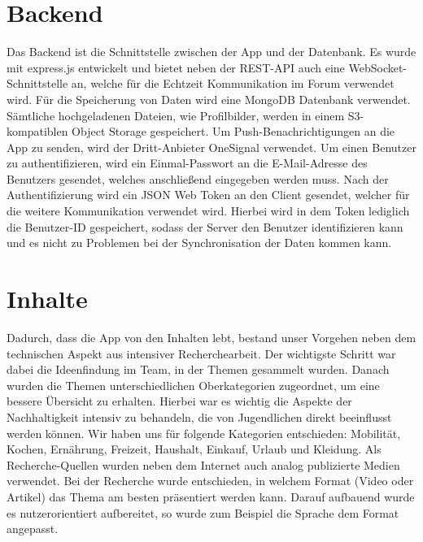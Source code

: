 \documentclass[../main.tex]{subfiles}
\begin{document}
    \section{Backend}
    Das Backend ist die Schnittstelle zwischen der App und der Datenbank.
    Es wurde mit express.js entwickelt und bietet neben der REST-API auch eine WebSocket-Schnittstelle an,
    welche für die Echtzeit Kommunikation im Forum verwendet wird.
    F\"ur die Speicherung von Daten wird eine MongoDB Datenbank verwendet.
    S\"amtliche hochgeladenen Dateien, wie Profilbilder, werden in einem S3-kompatiblen Object Storage gespeichert.
    Um Push-Benachrichtigungen an die App zu senden, wird der Dritt-Anbieter OneSignal verwendet.
    Um einen Benutzer zu authentifizieren, wird ein Einmal-Passwort an die E-Mail-Adresse des Benutzers gesendet, welches anschließend eingegeben werden muss.
    Nach der Authentifizierung wird ein JSON Web Token an den Client gesendet, welcher für die weitere Kommunikation verwendet wird.
    Hierbei wird in dem Token lediglich die Benutzer-ID gespeichert, sodass der Server den Benutzer identifizieren kann und es nicht zu Problemen bei der Synchronisation der Daten kommen kann.


    \section{Inhalte}\label{sec:minhalte}
    Dadurch, dass die App von den Inhalten lebt, bestand unser Vorgehen neben dem technischen Aspekt aus intensiver Recherchearbeit.
    Der wichtigste Schritt war dabei die Ideenfindung im Team, in der Themen gesammelt wurden.
    Danach wurden die Themen unterschiedlichen Oberkategorien zugeordnet, um eine bessere Übersicht zu erhalten.
    Hierbei war es wichtig die Aspekte der Nachhaltigkeit intensiv zu behandeln, die von Jugendlichen direkt beeinflusst werden können.
    Wir haben uns für folgende Kategorien entschieden: Mobilität, Kochen, Ernährung, Freizeit, Haushalt, Einkauf, Urlaub und Kleidung.
    Als Recherche-Quellen wurden neben dem Internet auch analog publizierte Medien verwendet.
    Bei der Recherche wurde entschieden, in welchem Format (Video oder Artikel) das Thema am besten präsentiert werden kann.
    Darauf aufbauend wurde es nutzerorientiert aufbereitet, so wurde zum Beispiel die Sprache dem Format angepasst.
\end{document}
